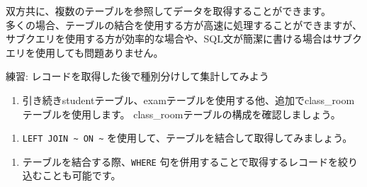 双方共に、複数のテーブルを参照してデータを取得することができます。\\
多くの場合、テーブルの結合を使用する方が高速に処理することができますが、サブクエリを使用する方が効率的な場合や、SQL文が簡潔に書ける場合はサブクエリを使用しても問題ありません。

練習: レコードを取得した後で種別分けして集計してみよう

\begin{enumerate}
\def\labelenumi{\arabic{enumi}.}
\tightlist
\item
  引き続きstudentテーブル、examテーブルを使用する他、追加でclass\_roomテーブルを使用します。
  class\_roomテーブルの構成を確認しましょう。
\end{enumerate}

\begin{Shaded}
\begin{Highlighting}[]
\end{Highlighting}
\end{Shaded}

\begin{enumerate}
\def\labelenumi{\arabic{enumi}.}
\setcounter{enumi}{1}
\tightlist
\item
  \texttt{LEFT\ JOIN\ \textasciitilde{}\ ON\ \textasciitilde{}}
  を使用して、テーブルを結合して取得してみましょう。
\end{enumerate}

\begin{Shaded}
\begin{Highlighting}[]
 \OperatorTok{*}  
\OperatorTok{=}\NormalTok{;}
\end{Highlighting}
\end{Shaded}

\begin{enumerate}
\def\labelenumi{\arabic{enumi}.}
\setcounter{enumi}{2}
\tightlist
\item
  テーブルを結合する際、\texttt{WHERE}
  句を併用することで取得するレコードを絞り込むことも可能です。
\end{enumerate}

\begin{Shaded}
\begin{Highlighting}[]
 \OperatorTok{*}  
\OperatorTok{=}
 \OperatorTok{=} \NormalTok{;}
\end{Highlighting}
\end{Shaded}

